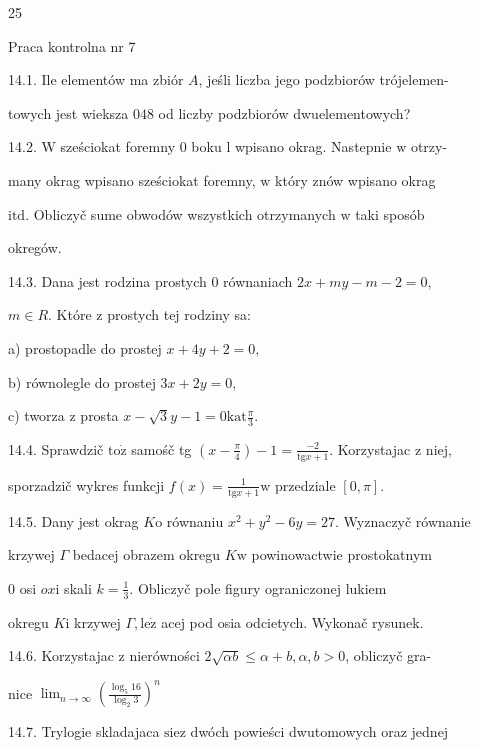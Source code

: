 \documentclass[a4paper,12pt]{article}
\begin{document}
25

Praca kontrolna nr 7

14.1. Ile elementów ma zbiór $A$, jeśli liczba jego podzbiorów trójelemen-

towych jest wieksza $048$ od liczby podzbiorów dwuelementowych?

14.2. $\mathrm{W}$ sześciokat foremny $0$ boku l wpisano okrag. Nastepnie $\mathrm{w}$ otrzy-

many okrag wpisano sześciokat foremny, $\mathrm{w}$ który znów wpisano okrag

$\mathrm{i}\mathrm{t}\mathrm{d}$. Obliczyč sume obwodów wszystkich otrzymanych $\mathrm{w}$ taki sposób

okregów.

14.3. Dana jest rodzina prostych $0$ równaniach $2x+my-m-2 = 0,$

$m\in R$. Które $\mathrm{z}$ prostych tej rodziny sa:

a) prostopadle do prostej $x+4y+2=0,$

b) równolegle do prostej $3x+2y=0,$

c) tworza $\mathrm{z}$ prosta $x-\displaystyle \sqrt{3}y-1=0\mathrm{k}\mathrm{a}\mathrm{t}\frac{\pi}{3}.$

14.4. Sprawdzič $\mathrm{t}\mathrm{o}\dot{\mathrm{z}}$ samośč tg $(x-\displaystyle \frac{\pi}{4})-1=\frac{-2}{\mathrm{t}\mathrm{g}x+1}$. Korzystajac $\mathrm{z}$ niej,

sporzadzič wykres funkcji $f(x)=\displaystyle \frac{1}{\mathrm{t}\mathrm{g}x+1}\mathrm{w}$ przedziale $[0,\pi].$

14.5. Dany jest okrag $K\mathrm{o}$ równaniu $x^{2}+y^{2}-6y=27$. Wyznaczyč równanie

krzywej $\Gamma$ bedacej obrazem okregu $K\mathrm{w}$ powinowactwie prostokatnym

$0$ osi $ox \mathrm{i}$ skali $k = \displaystyle \frac{1}{3}$. Obliczyč pole figury ograniczonej lukiem

okregu $K\mathrm{i}$ krzywej $\Gamma, \mathrm{l}\mathrm{e}\dot{\mathrm{z}}$ acej pod osia odcietych. Wykonač rysunek.

14.6. Korzystajac $\mathrm{z}$ nierówności $2\sqrt{\alpha b} \leq \alpha+b, \alpha, b > 0$, obliczyč gra-

nice $\displaystyle \lim_{n\rightarrow\infty}(\frac{\log_{5}16}{\log_{2}3})^{n}$

14.7. Trylogie skladajaca $\mathrm{s}\mathrm{i}\mathrm{e}\mathrm{z}$ dwóch powieści dwutomowych oraz jednej
\end{document}
